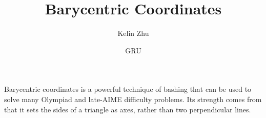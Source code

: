 \documentclass{article}
\title{Barycentric Coordinates}
\author{Kelin Zhu}
\date{GRU}
\begin{document}
\maketitle
Barycentric coordinates is a powerful technique of bashing that can be used to solve many Olympiad and late-AIME difficulty problems. Its strength comes from that it sets the sides of a triangle as axes, rather than two perpendicular lines.
\end{document}
